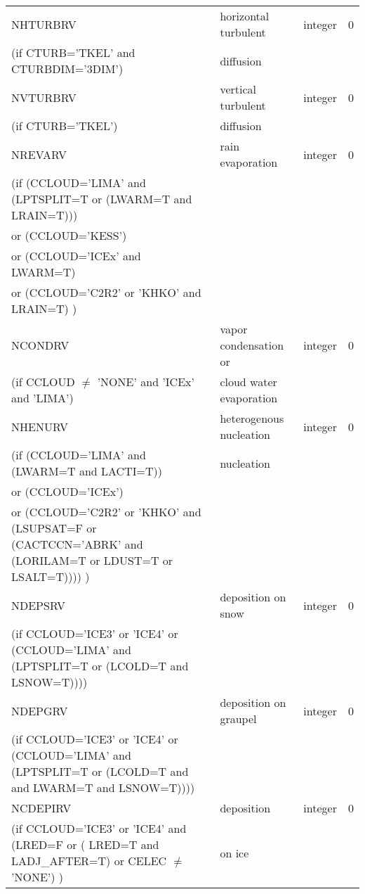 \begin{longtable} {|p{}|p{}|>{\centering}p{}|p{}<{\centering}|}
NHTURBRV & horizontal turbulent & integer  &  0 \index{NHTURBRV!\innam{NAM\_BU\_RRV}}\\ \nopagebreak
(if CTURB='TKEL' and CTURBDIM='3DIM') &diffusion &   &  \\\hline
NVTURBRV & vertical turbulent& integer  &  0 \index{NVTURBRV!\innam{NAM\_BU\_RRV}}\\ \nopagebreak
(if CTURB='TKEL') &diffusion &   &  \\\hline
NREVARV & rain evaporation & integer  &  0 \index{NREVARV!\innam{NAM\_BU\_RRV}}\\ \nopagebreak
(if (CCLOUD='LIMA' and (LPTSPLIT=T or (LWARM=T and LRAIN=T))) & & & \\ \nopagebreak
 or (CCLOUD='KESS') & & & \\ \nopagebreak
 or (CCLOUD='ICEx' and LWARM=T) & & & \\ \nopagebreak
 or (CCLOUD='C2R2' or 'KHKO' and LRAIN=T) ) & & & \\ \hline
NCONDRV   & vapor condensation or & integer  &  0 \index{NCONDRV!\innam{NAM\_BU\_RRV}}\\ \nopagebreak
(if CCLOUD $\neq$ 'NONE' and 'ICEx' and 'LIMA') &cloud water evaporation &   &  \\\hline
NHENURV   & heterogenous nucleation & integer  &  0 \index{NHENURV!\innam{NAM\_BU\_RRV}}\\ \nopagebreak
(if (CCLOUD='LIMA' and (LWARM=T and LACTI=T)) & nucleation & & \\ \nopagebreak
 or (CCLOUD='ICEx') & & & \\ \nopagebreak
 or (CCLOUD='C2R2' or 'KHKO' and (LSUPSAT=F or (CACTCCN='ABRK' and (LORILAM=T or LDUST=T or LSALT=T)))) ) & & & \\ \hline
NDEPSRV   & deposition on snow & integer  &  0 \index{NDEPSRV!\innam{NAM\_BU\_RRV}}\\ \nopagebreak
(if CCLOUD='ICE3' or 'ICE4' or (CCLOUD='LIMA' and (LPTSPLIT=T or (LCOLD=T and LSNOW=T)))) & &   &  \\\hline
NDEPGRV   & deposition on graupel & integer  &  0 \index{NDEPGRV!\innam{NAM\_BU\_RRV}}\\ \nopagebreak
(if CCLOUD='ICE3' or 'ICE4' or (CCLOUD='LIMA' and (LPTSPLIT=T or (LCOLD=T and and LWARM=T and LSNOW=T)))) & &   &  \\\hline
NCDEPIRV   & deposition & integer  &  0 \index{NCDEPIRV!\innam{NAM\_BU\_RRV}}\\ \nopagebreak
(if CCLOUD='ICE3' or 'ICE4' and (LRED=F or ( LRED=T and LADJ\_AFTER=T) or CELEC $\neq$ 'NONE')  ) &on ice &   &  \\\hline

\end{longtable}
